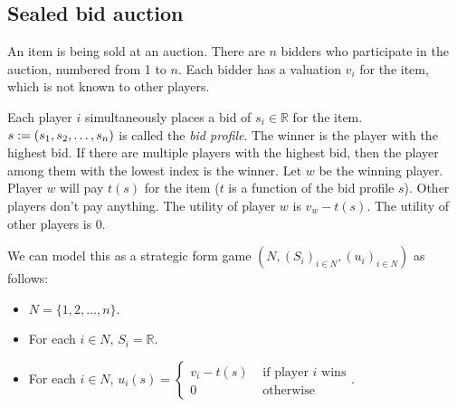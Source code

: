 \subsection{Sealed bid auction}

An item is being sold at an auction.
There are $n$ bidders who participate in the auction, numbered from 1 to $n$.
Each bidder has a valuation $v_i$ for the item, which is not known to other players.

Each player $i$ simultaneously places a bid of $s_i \in \mathbb{R}$ for the item.
$s := (s_1, s_2, \ldots, s_n)$ is called the \emph{bid profile}.
The winner is the player with the highest bid.
If there are multiple players with the highest bid,
then the player among them with the lowest index is the winner.
Let $w$ be the winning player. Player $w$ will pay $t(s)$ for the item
($t$ is a function of the bid profile $s$).
Other players don't pay anything.
The utility of player $w$ is $v_w - t(s)$. The utility of other players is $0$.

We can model this as a strategic form game $(N, (S_i)_{i \in N}, (u_i)_{i \in N})$ as follows:
\begin{itemize}
\item $N = \{1, 2, \ldots, n\}$.
\item For each $i \in N$, $S_i = \mathbb{R}$.
\item For each $i \in N$, $u_i(s) = \begin{cases}
\displaystyle v_i - t(s) & \textrm{ if player $i$ wins}
\\ \displaystyle 0 & \textrm{ otherwise}
\end{cases}$.
\end{itemize}



